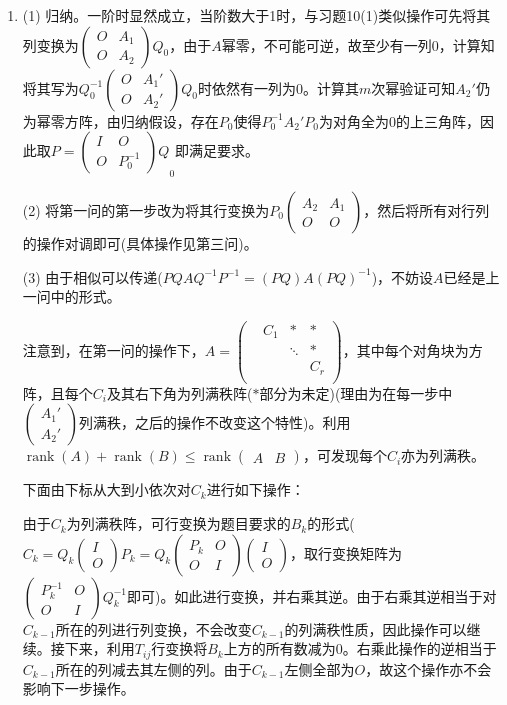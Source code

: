 \documentclass[a4paper,UTF8,fontset=windows]{ctexart}
\DeclareMathOperator{\rank}{rank}
\begin{document}
\begin{enumerate}
\item
(1) 归纳。一阶时显然成立，当阶数大于1时，与习题10(1)类似操作可先将其列变换为$\begin{pmatrix}O&A_1\\O&A_2\end{pmatrix}Q_0$，由于$A$幂零，不可能可逆，故至少有一列0，计算知将其写为$Q_0^{-1}\begin{pmatrix}O&A_1'\\O&A_2'\end{pmatrix}Q_0$时依然有一列为0。计算其$m$次幂验证可知$A_2'$仍为幂零方阵，由归纳假设，存在$P_0$使得$P_0^{-1}A_2' P_0$为对角全为0的上三角阵，因此取$P={\begin{pmatrix}I&O\\O&P_0^{-1}\end{pmatrix}Q}_0$即满足要求。

(2) 将第一问的第一步改为将其行变换为$P_0\begin{pmatrix}A_2&A_1\\O&O\end{pmatrix}$，然后将所有对行列的操作对调即可(具体操作见第三问)。

(3) 由于相似可以传递($PQAQ^{-1}P^{-1}=(PQ)A(PQ)^{-1}$)，不妨设$A$已经是上一问中的形式。

注意到，在第一问的操作下，$A=\begin{pmatrix}&C_1&\ast&\ast\\&&\ddots&\ast\\&&&C_r\\&&&\end{pmatrix}$，其中每个对角块为方阵，且每个$C_i$及其右下角为列满秩阵($*$部分为未定)(理由为在每一步中$\begin{pmatrix}A_1'\\A_2'\end{pmatrix}$列满秩，之后的操作不改变这个特性)。利用$\rank(A)+\rank(B)\le\rank\begin{pmatrix}A&B\end{pmatrix}$，可发现每个$C_i$亦为列满秩。

下面由下标从大到小依次对$C_k$进行如下操作：

由于$C_k$为列满秩阵，可行变换为题目要求的$B_k$的形式($C_k=Q_k\begin{pmatrix}I\\O\end{pmatrix}P_k=Q_k\begin{pmatrix}P_k&O\\O&I\end{pmatrix}\begin{pmatrix}I\\O\end{pmatrix}$，取行变换矩阵为$\begin{pmatrix}P_k^{-1}&O\\O&I\end{pmatrix}Q_k^{-1}$即可)。如此进行变换，并右乘其逆。由于右乘其逆相当于对$C_{k-1}$所在的列进行列变换，不会改变$C_{k-1}$的列满秩性质，因此操作可以继续。接下来，利用$T_{ij}$行变换将$B_k$上方的所有数减为0。右乘此操作的逆相当于$C_{k-1}$所在的列减去其左侧的列。由于$C_{k-1}$左侧全部为$O$，故这个操作亦不会影响下一步操作。


\end{enumerate}
\end{document}
